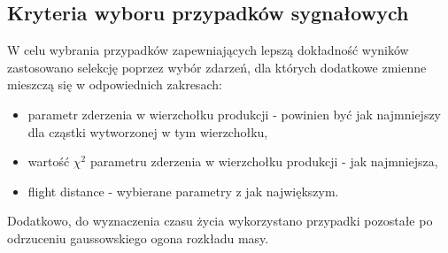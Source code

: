 \subsection{Kryteria wyboru przypadków sygnałowych}
W celu wybrania przypadków zapewniających lepszą dokładność wyników zastosowano selekcję poprzez wybór zdarzeń, dla których dodatkowe zmienne mieszczą się w odpowiednich zakresach:
\begin{itemize}
\item parametr zderzenia w wierzchołku produkcji - powinien być jak najmniejszy dla cząstki wytworzonej w tym wierzchołku,
\item wartość $\chi^2$ parametru zderzenia w wierzchołku produkcji - jak najmniejsza,
\item flight distance - wybierane parametry z jak największym.
\end{itemize}

Dodatkowo, do wyznaczenia czasu życia wykorzystano przypadki pozostałe po odrzuceniu gaussowskiego ogona rozkładu masy.